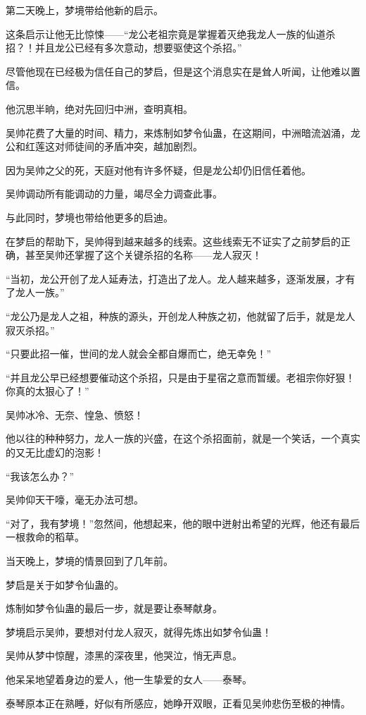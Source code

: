 \begin{this_body}
第二天晚上，梦境带给他新的启示。

这条启示让他无比惊悚——“龙公老祖宗竟是掌握着灭绝我龙人一族的仙道杀招？！并且龙公已经有多次意动，想要驱使这个杀招。”

尽管他现在已经极为信任自己的梦启，但是这个消息实在是耸人听闻，让他难以置信。

他沉思半晌，绝对先回归中洲，查明真相。

吴帅花费了大量的时间、精力，来炼制如梦令仙蛊，在这期间，中洲暗流汹涌，龙公和红莲这对师徒间的矛盾冲突，越加剧烈。

因为吴帅之父的死，天庭对他有许多怀疑，但是龙公却仍旧信任着他。

吴帅调动所有能调动的力量，竭尽全力调查此事。

与此同时，梦境也带给他更多的启迪。

在梦启的帮助下，吴帅得到越来越多的线索。这些线索无不证实了之前梦启的正确，甚至吴帅还掌握了这个关键杀招的名称——龙人寂灭！

“当初，龙公开创了龙人延寿法，打造出了龙人。龙人越来越多，逐渐发展，才有了龙人一族。”

“龙公乃是龙人之祖，种族的源头，开创龙人种族之初，他就留了后手，就是龙人寂灭杀招。”

“只要此招一催，世间的龙人就会全都自爆而亡，绝无幸免！”

“并且龙公早已经想要催动这个杀招，只是由于星宿之意而暂缓。老祖宗你好狠！你真的太狠心了！”

吴帅冰冷、无奈、惶急、愤怒！

他以往的种种努力，龙人一族的兴盛，在这个杀招面前，就是一个笑话，一个真实的又无比虚幻的泡影！

“我该怎么办？”

吴帅仰天干嚎，毫无办法可想。

“对了，我有梦境！”忽然间，他想起来，他的眼中迸射出希望的光辉，他还有最后一根救命的稻草。

当天晚上，梦境的情景回到了几年前。

梦启是关于如梦令仙蛊的。

炼制如梦令仙蛊的最后一步，就是要让泰琴献身。

梦境启示吴帅，要想对付龙人寂灭，就得先炼出如梦令仙蛊！

吴帅从梦中惊醒，漆黑的深夜里，他哭泣，悄无声息。

他呆呆地望着身边的爱人，他一生挚爱的女人——泰琴。

泰琴原本正在熟睡，好似有所感应，她睁开双眼，正看见吴帅悲伤至极的神情。


\end{this_body}
